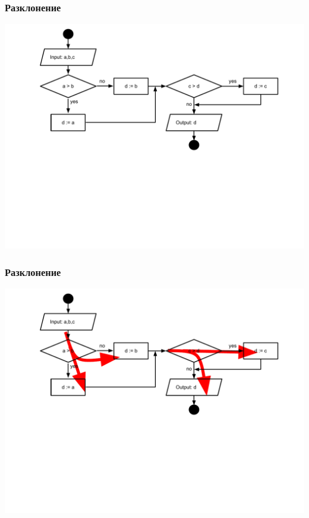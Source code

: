 \documentclass{beamer}
\begin{document}
\begin{frame}[fragile]
\frametitle{Разклонение}

\hspace*{-30pt}
\includegraphics[width=14cm]{images/fc_if} 

\end{frame}


\begin{frame}[fragile]
\frametitle{Разклонение}

\hspace*{-30pt}
\includegraphics[width=14cm]{images/fc_if_arrows} 

\end{frame}
\end{document}
